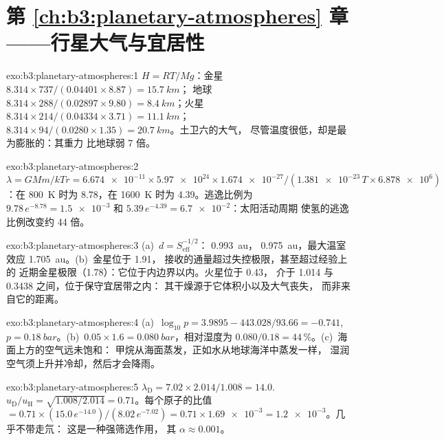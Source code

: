 \section*{第 \ref{ch:b3:planetary-atmospheres} 章——行星大气与宜居性}

\begin{solution}{exo:b3:planetary-atmospheres:1}
$H = RT/Mg$：金星 $8.314\times737/(0.04401\times8.87) = \qty{15.7}{km}$；
地球 $8.314\times288/(0.02897\times9.80) = \qty{8.4}{km}$；火星
$8.314\times214/(0.04334\times3.71) = \qty{11.1}{km}$；
$8.314\times94/(0.0280\times1.35) = \qty{20.7}{km}$。土卫六的大气，
尽管温度很低，却是最为膨胀的：其重力
比地球弱 7 倍。
\end{solution}

\begin{solution}{exo:b3:planetary-atmospheres:2}
$\lambda = GMm/kTr = \num{6.674e-11}\times\num{5.97e24}\times\num{1.674e-27}
/(\num{1.381e-23}\,T\times\num{6.878e6})$：在 \qty{800}{K} 时为 8.78，在
\qty{1600}{K} 时为 4.39。逃逸比例为 $9.78\,e^{-8.78} =
\num{1.5e-3}$ 和 $5.39\,e^{-4.39} = \num{6.7e-2}$：太阳活动周期
使氢的逃逸比例改变约 44 倍。
\end{solution}

\begin{solution}{exo:b3:planetary-atmospheres:3}
(a)~$d = S_\mathrm{eff}^{-1/2}$： \qty{0.993}{au}， \qty{0.975}{au}，最大温室效应 \qty{1.705}{au}。(b)~金星位于 1.91，
接收的通量超过失控极限，甚至超过经验上的
近期金星极限（1.78）：它位于内边界以内。火星位于 0.43，
介于 1.014 与 0.3438 之间，位于保守宜居带之内：
其干燥源于它体积小以及大气丧失，
而非来自它的距离。
\end{solution}

\begin{solution}{exo:b3:planetary-atmospheres:4}
(a)~$\log_{10}p = 3.9895 - 443.028/93.66 = -0.741$, $p =
\qty{0.18}{bar}$。(b)~$0.05\times1.6 = \qty{0.080}{bar}$，相对湿度为
$0.080/0.18 = 44\,\%$。(c)~海面上方的空气远未饱和：
甲烷从海面蒸发，正如水从地球海洋中蒸发一样，
湿润空气须上升并冷却，然后才会降雨。
\end{solution}

\begin{solution}{exo:b3:planetary-atmospheres:5}
$\lambda_\mathrm D = 7.02\times2.014/1.008 = 14.0$. $u_\mathrm D/u_\mathrm H
= \sqrt{1.008/2.014} = 0.71$。每个原子的比值 $= 0.71\times(15.0\,
e^{-14.0})/(8.02\,e^{-7.02}) = 0.71\times\num{1.69e-3} = \num{1.2e-3}$。几乎不带走氘：
这是一种强筛选作用，
其 $\alpha \approx 0.001$。
\end{solution}

